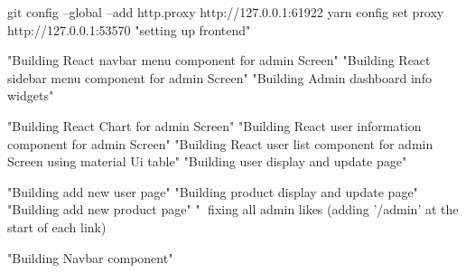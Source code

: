 git config --global --add http.proxy http://127.0.0.1:61922
yarn config set proxy http://127.0.0.1:53570
"setting up frontend"

"Building React navbar menu component for admin Screen"
"Building React sidebar menu component for admin Screen"
"Building Admin dashboard info widgets"

"Building React Chart for admin Screen"
"Building React user information component for admin Screen"
"Building React user list component for admin Screen using material Ui table"
"Building user display and update page"

"Building add new user page"
"Building product display and update page"
"Building add new product page"
"🔨 fixing all admin likes (adding '/admin' at the start of each link)

"Building Navbar component"